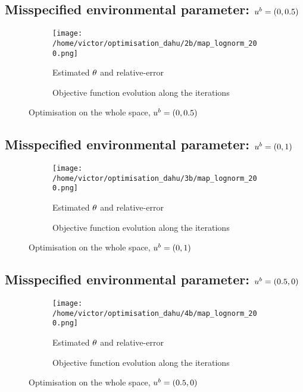 \documentclass[../../Main_ManuscritThese.tex]{subfiles}
\begin{document}
\subsection*{Misspecified environmental parameter: $u^b=(0, 0.5)$}
\begin{figure}[ht]
  \begin{subfigure}{\textwidth}
  \centering
  \texttt{[image: /home/victor/optimisation\_dahu/2b/map\_lognorm\_200.png]}
  \caption{Estimated $\theta$ and relative-error}
\end{subfigure}
\begin{subfigure}{\textwidth}
  \centering
    \resizebox{1\textwidth}{!}{}
    \caption{Objective function evolution along the iterations}
  \end{subfigure}
  \caption{Optimisation on the whole space, $u^b=(0, 0.5)$}
\end{figure}
\clearpage
\subsection*{Misspecified environmental parameter: $u^b=(0, 1)$}
\begin{figure}[ht]
  \begin{subfigure}{\textwidth}
  \centering
  \texttt{[image: /home/victor/optimisation\_dahu/3b/map\_lognorm\_200.png]}
  \caption{Estimated $\theta$ and relative-error}
\end{subfigure}
\begin{subfigure}{\textwidth}
  \centering
  \resizebox{1\textwidth}{!}{}
    \caption{Objective function evolution along the iterations}
\end{subfigure}
\caption{Optimisation on the whole space, $u^b=(0, 1)$}
\end{figure}
\clearpage
\subsection*{Misspecified environmental parameter: $u^b=(0.5, 0)$}
\begin{figure}[ht]
  \begin{subfigure}{\textwidth}
  \centering
  \texttt{[image: /home/victor/optimisation\_dahu/4b/map\_lognorm\_200.png]}
  \caption{Estimated $\theta$ and relative-error}
\end{subfigure}
\begin{subfigure}{\textwidth}
  \centering
  \resizebox{1\textwidth}{!}{}
    \caption{Objective function evolution along the iterations}
\end{subfigure}
\caption{Optimisation on the whole space, $u^b=(0.5, 0)$}
\end{figure}
\clearpage
\end{document}
